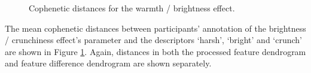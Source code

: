 			\begin{figure}[h!]
				\centering
				\quad
				\caption{Cophenetic distances for the warmth / brightness effect.}
				\label{fig:HarshCophs}
			\end{figure}

			The mean cophenetic distances between participants' annotation of the brightness / crunchiness
			effect's parameter and the descriptors `harsh', `bright' and `crunch' are shown in Figure
			\ref{fig:HarshCophs}. Again, distances in both the processed feature dendrogram and
			feature difference dendrogram are shown separately.

